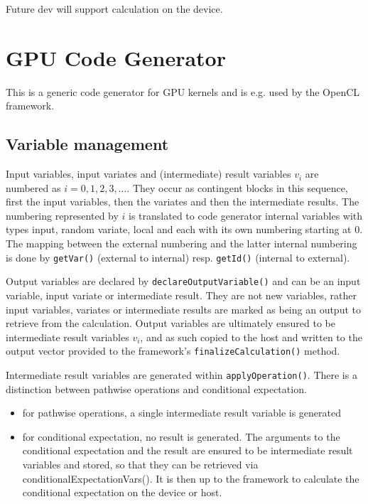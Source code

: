 \documentclass[12pt, a4paper]{article}
\begin{document}
Future dev will support calculation on the device.

\section{GPU Code Generator}\label{gpuCodeGenerator}

This is a generic code generator for GPU kernels and is e.g. used by the OpenCL framework.

\subsection{Variable management}

Input variables, input variates and (intermediate) result variables $v_i$ are numbered as $i= 0, 1, 2, 3, \ldots$. They
occur as contingent blocks in this sequence, first the input variables, then the variates and then the intermediate
results. The numbering represented by $i$ is translated to code generator internal variables with types input, random
variate, local and each with its own numbering starting at $0$. The mapping between the external numbering and the
latter internal numbering is done by \verb+getVar()+ (external to internal) resp. \verb+getId()+ (internal to external).

Output variables are declared by \verb+declareOutputVariable()+ and can be an input variable, input variate or
intermediate result. They are not new variables, rather input variables, variates or intermediate results are marked as
being an output to retrieve from the calculation. Output variables are ultimately ensured to be intermediate result
variables $v_i$, and as such copied to the host and written to the output vector provided to the framework's
\verb+finalizeCalculation()+ method.

Intermediate result variables are generated within \verb+applyOperation()+. There is a distinction between pathwise
operations and conditional expectation.

\begin{itemize}
\item for pathwise operations, a single intermediate result variable is generated
\item for conditional expectation, no result is generated. The arguments to the conditional expectation and the result
  are ensured to be intermediate result variables and stored, so that they can be retrieved via
  conditionalExpectationVars(). It is then up to the framework to calculate the conditional expectation on the device or
  host.
\end{itemize}
\end{document}
